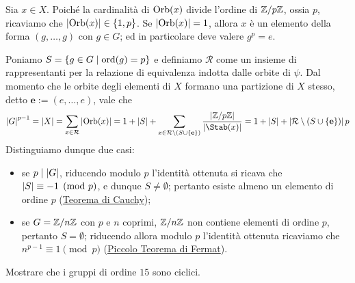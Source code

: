 \documentclass[11pt]{scrartcl}
\begin{document}
	Sia $x \in X$. Poiché la cardinalità di $\operatorname{Orb}(x)$ divide l'ordine di ${\mathbb Z}/p{\mathbb Z}$, ossia
	$p$, ricaviamo che $\left\lvert \operatorname{Orb}(x) \right\rvert \in \{1, p\}$. Se $\left\lvert \operatorname{Orb}(x) \right\rvert = 1$, allora
	$x$ è un elemento della forma $(g, \ldots, g)$ con $g \in G$; ed in particolare
	deve valere $g^p = e$. \medskip

	Poniamo $S = \{g\in G \mid \operatorname{ord}(g) = p\}$ e definiamo $\mathcal{R}$ come un insieme di 
	rappresentanti per la relazione di equivalenza indotta dalle orbite di $\psi$. Dal
	momento che
	le orbite degli elementi di $X$ formano una partizione di $X$ stesso, detto
	$\mathbf{e} := (e, \ldots, e)$, vale che
	\[
	\abs{G}^{p - 1} = \abs{X} = \sum_{x \in \mathcal{R}} \abs{\Orb(x)} = 1 + \abs{S} + \sum_{x \in \mathcal{R}\setminus (S \cup \{ \mathbf{e} \} )} \frac{\abs{\Zp}}{\abs{\Stab(x)}} = 1 + \abs{S} + \abs{\mathcal{R} \setminus (S \cup \{ \mathbf{e} \})} p
	\]
	Distinguiamo dunque due casi:
	\begin{itemize}
		\item se $p \mid \left\lvert G \right\rvert$, riducendo modulo $p$ l'identità ottenuta si ricava che
		$\left\lvert S \right\rvert \equiv -1 \pmod p$, e dunque $S \neq \emptyset$; pertanto
		esiste almeno un elemento di
		ordine $p$ (\hyperref[teorema1.44]{Teorema di Cauchy});
		\item se $G = {\mathbb Z}/n{\mathbb Z}$ con $p$ e $n$ coprimi, ${\mathbb Z}/n{\mathbb Z}$ non contiene elementi
		di ordine $p$, pertanto $S = \emptyset$; riducendo allora modulo $p$ l'identità ottenuta ricaviamo che
		$n^{p - 1} \equiv 1 \pmod p$ (\hyperref[teorema1.45]{Piccolo Teorema di Fermat}).
	\end{itemize}
	
	\begin{exercise}
		Mostrare che i gruppi di ordine $15$ sono ciclici.
	\end{exercise}
	
\end{document}
